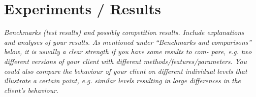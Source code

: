 \section{Experiments / Results}
\label{sec:experiments}

\textit{Benchmarks (test results) and possibly competition results. Include explanations and analyses of your results. As mentioned under “Benchmarks and comparisons” below, it is usually a clear strength if you have some results to com- pare, e.g. two different versions of your client with different methods/features/parameters. You could also compare the behaviour of your client on different individual levels that illustrate a certain point, e.g. similar levels resulting in large differences in the client’s behaviour.}
